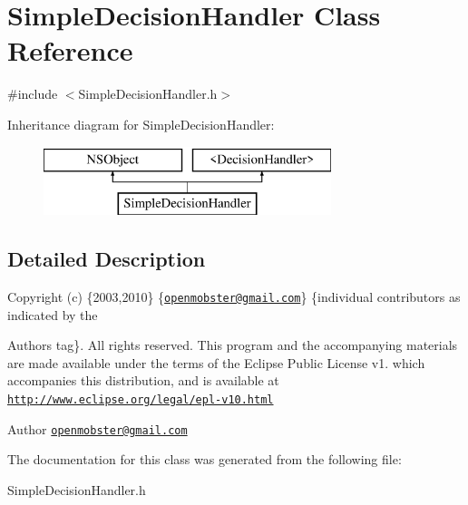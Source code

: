 \hypertarget{interface_simple_decision_handler}{
\section{\-Simple\-Decision\-Handler \-Class \-Reference}
\label{interface_simple_decision_handler}
}


{\ttfamily \#include $<$\-Simple\-Decision\-Handler.\-h$>$}

\-Inheritance diagram for \-Simple\-Decision\-Handler\-:\begin{figure}[H]
\begin{center}
\leavevmode
\includegraphics[height=2.000000cm]{interface_simple_decision_handler}
\end{center}
\end{figure}


\subsection{\-Detailed \-Description}
\-Copyright (c) \{2003,2010\} \{\href{mailto:openmobster@gmail.com}{\tt openmobster@gmail.\-com}\} \{individual contributors as indicated by the \begin{DoxyAuthor}{\-Authors}
tag\}. \-All rights reserved. \-This program and the accompanying materials are made available under the terms of the \-Eclipse \-Public \-License v1. which accompanies this distribution, and is available at \href{http://www.eclipse.org/legal/epl-v10.html}{\tt http\-://www.\-eclipse.\-org/legal/epl-\/v10.\-html}
\end{DoxyAuthor}
\begin{DoxyAuthor}{\-Author}
\href{mailto:openmobster@gmail.com}{\tt openmobster@gmail.\-com} 
\end{DoxyAuthor}


\-The documentation for this class was generated from the following file\-:\begin{DoxyCompactItemize}
\item 
\-Simple\-Decision\-Handler.\-h\end{DoxyCompactItemize}
